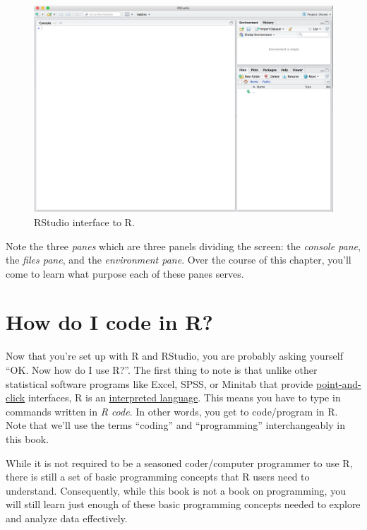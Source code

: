 \documentclass[]{book}
\begin{document}
\begin{figure}

{\centering \includegraphics[width=0.93\linewidth]{images/rstudio_screenshots/rstudio} 

}

\caption{RStudio interface to R.}\label{fig:RStudio-interface}
\end{figure}

Note the three \emph{panes} which are three panels dividing the screen: the \emph{console pane}, the \emph{files pane}, and the \emph{environment pane}. Over the course of this chapter, you'll come to learn what purpose each of these panes serves.

\hypertarget{code}{%
\section{How do I code in R?}\label{code}}

Now that you're set up with R and RStudio, you are probably asking yourself ``OK. Now how do I use R?''. The first thing to note is that unlike other statistical software programs like Excel, SPSS, or Minitab that provide \href{https://en.wikipedia.org/wiki/Point_and_click}{point-and-click} interfaces, R is an \href{https://en.wikipedia.org/wiki/Interpreted_language}{interpreted language}. This means you have to type in commands written in \emph{R code}. In other words, you get to code/program in R. Note that we'll use the terms ``coding'' and ``programming'' interchangeably in this book.

While it is not required to be a seasoned coder/computer programmer to use R, there is still a set of basic programming concepts that R users need to understand. Consequently, while this book is not a book on programming, you will still learn just enough of these basic programming concepts needed to explore and analyze data effectively.
\end{document}
